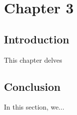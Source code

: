 \chapter{Chapter 3}
\minitoc
\label{chap:3rd}
\section*{Introduction}
    This chapter delves 
\section*{Conclusion}
    In this section, we...